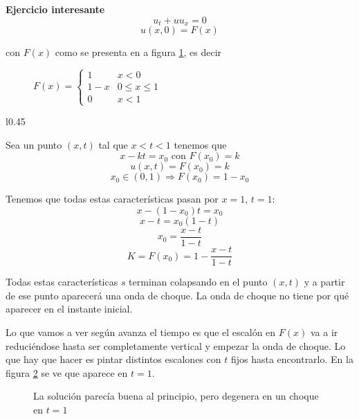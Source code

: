 		\textbf{Ejercicio interesante}
			$$u_t + uu_x = 0$$
			$$u(x,0) = F(x) $$

			con $F(x)$ como se presenta en a figura \ref{fig:ejer-feb-2-F}, es decir
			\begin{figure}[hbtp]
			\begin{minipage}{0.45\textwidth}
				\centering
				\caption{ }
				\label{fig:ejer-feb-2-F}
			\end{minipage}
			\begin{minipage}{0.45\textwidth}
				$ F(x) = \begin{cases}
					1   & x < 0\\
					1-x & 0 \leq x \leq 1\\
					0   & x < 1
				\end{cases}
				$
			\end{minipage}
			\end{figure}

			\begin{wrapfigure}{l}{0.45\textwidth}
				\vspace{-15pt}
				\caption{hay un choque en $(1,1)$}
				\label{fig:ejer-feb-2-XT} %
				\vspace{15pt}
			\end{wrapfigure}

			Sea un punto $(x,t)$ tal que $x<t<1$ tenemos que
			$$x - kt = x_0 \text{ con } F(x_0) = k $$
			$$u(x,t) = F(x_0) = k$$
			$$x_0 \in (0,1) \Rightarrow F(x_0) = 1 - x_0 $$

			Tenemos que todas estas características pasan por $x = 1$, $t = 1$:
			$$x - (1-x_0) t = x_0$$
			$$x-t = x_0 (1-t)$$
			$$x_0 = \frac{x-t}{1-t}$$
			$$K = F(x_0) = 1 - \frac{x-t}{1-t}$$

			Todas estas características $s$ terminan colapsando en el punto $(x,t)$ y a partir de ese punto aparecerá una onda de choque. La onda de choque no tiene por qué aparecer en el instante inicial.

			Lo que vamos a ver según avanza el tiempo es que el escalón en $F(x)$ va a ir reduciéndose hasta ser completamente vertical y empezar la onda de choque. Lo que hay que hacer es pintar distintos escalones con $t$ fijos hasta encontrarlo. En la figura \ref{fig:ejer-feb-2-choque} se ve que aparece en $t=1$.

			\begin{figure}[hbtp]
				\centering
				\caption{La solución parecía buena al principio, pero degenera en un choque en $t=1$}
				\label{fig:ejer-feb-2-choque}
			\end{figure}

